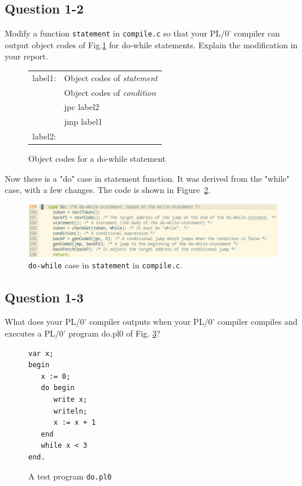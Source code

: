 \documentclass{article}
\begin{document}
\subsection*{Question 1-2}
Modify a function {\tt statement} in {\tt compile.c} 
so that your PL/0' compiler can output object codes of Fig.\ref{fig:dowhile-code} for
do-while statements.
Explain the modification in your report.

\begin{figure}[h]
\begin{tabular}{ll}
label1: & Object codes of {\it statement} \\
        & Object codes of {\it condition} \\
        & jpc label2 \\
        & jmp label1 \\
label2: & \\
\end{tabular}
\caption{Object codes for a do-while statement}
\label{fig:dowhile-code}
\end{figure}

\ifreport
Now there is a "do" case in statement function. It was derived from the "while" case, with a few changes. The code is shown in Figure~\ref{fig:q12}. \\
\begin{figure}[h]
  \includegraphics[scale=0.35]{./img/Q1-2.png}
  \centering
  \caption{{\tt do-while} case in {\tt statement} in {\tt compile.c}.}
  \label{fig:q12}
\end{figure}
\fi



\subsection*{Question 1-3}
What does your PL/0' compiler outputs when your PL/0' compiler compiles
and executes a PL/0' program do.pl0 of Fig. \ref{fig:do-while}?

\begin{figure}[h]
\begin{verbatim}
var x;
begin
   x := 0;
   do begin
      write x;
      writeln;
      x := x + 1
   end
   while x < 3
end.
\end{verbatim}
\caption{A test program {\tt do.pl0}}\label{fig:do-while}
\end{figure}
\end{document}
